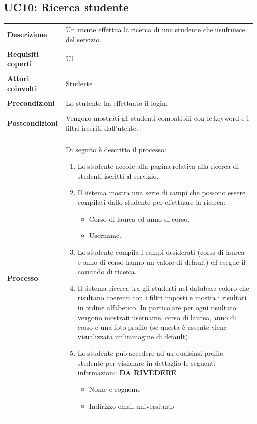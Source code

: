 \documentclass[10pt,a4paper]{report}
\begin{document}
	\subsection{UC10: Ricerca studente}
	\begin{tabular}{lp{}}
		\textbf{Descrizione}&Un utente effettua la ricerca di uno studente che usufruisce del servizio.\\
		\\
		\textbf{Requisiti coperti}&U1\\
		\\
		\textbf{Attori coinvolti}&Studente\\
		\\
		\textbf{Precondizioni}&Lo studente ha effettuato il login.\\
		\\
		\textbf{Postcondizioni}&Vengono mostrati gli studenti compatibili con le keyword e i filtri inseriti dall'utente.\\
		\\
		\textbf{Processo}&Di seguito è descritto il processo:
		\begin{enumerate}
			\item Lo studente accede alla pagina relativa alla ricerca di studenti iscritti al servizio.
			\item Il sistema mostra una serie di campi che possono essere compilati dallo studente per effettuare la ricerca:
			\begin{itemize}
				\item Corso di laurea ed anno di corso.
				\item Username.		
			\end{itemize}
			\item Lo studente compila i campi desiderati (corso di laurea e anno di corso hanno un valore di default) ed esegue il comando di ricerca.
			\item Il sistema ricerca tra gli studenti nel database coloro che risultano coerenti con i filtri imposti e mostra i risultati in ordine alfabetico. In particolare per ogni risultato vengono mostrati username, corso di laurea, anno di corso e una foto profilo (se questa è assente viene visualizzata un'immagine di default).
			\item Lo studente può accedere ad un qualsiasi profilo studente per visionare in dettaglio le seguenti informazioni: \textbf{DA RIVEDERE}
			\begin{itemize}
				\item Nome e cognome
				\item Indirizzo email universitario

\end{itemize}
\end{enumerate}
\end{tabular}
\end{document}
